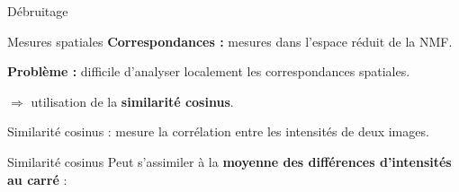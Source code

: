 \documentclass[10pt]{beamer}
\begin{document}
\begin{frame}{Débruitage}
\begin{figure}[ht]
 \end{figure}


\end{frame}



\begin{frame}{Mesures spatiales}
  \textbf{Correspondances :} mesures dans l'espace réduit de la NMF.

  \textbf{Problème :} difficile d'analyser localement les correspondances spatiales.
  
  $\Rightarrow$ utilisation de la \textbf{similarité cosinus}.

  \alert{Similarité cosinus :} mesure la corrélation entre les intensités de deux images.
\end{frame}

\begin{frame}{Similarité cosinus}
  Peut s'assimiler à la \textbf{moyenne des différences d'intensités au carré} :


\end{frame}
\end{document}
